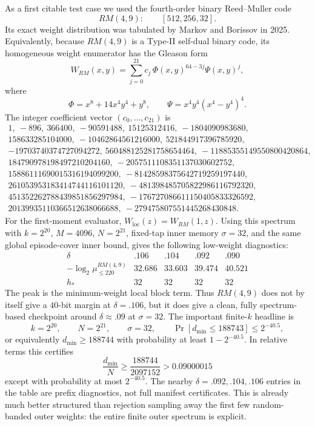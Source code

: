 As a first citable test case we used the fourth-order binary Reed--Muller code
\[
RM(4,9):\qquad [512,256,32].
\]
Its exact weight distribution was tabulated by Markov and Borissov in 2025.  Equivalently, because \(RM(4,9)\) is a
Type-II self-dual binary code, its homogeneous weight enumerator has the Gleason form
\[
W_{RM}(x,y)
=
\sum_{j=0}^{21} c_j\,
\Phi(x,y)^{64-3j}\Psi(x,y)^j,
\]
where
\[
\Phi=x^8+14x^4y^4+y^8,
\qquad
\Psi=x^4y^4(x^4-y^4)^4.
\]
The integer coefficient vector \((c_0,\ldots,c_{21})\) is
\[
\begin{gathered}
1,\ -896,\ 366400,\ -90591488,\ 15125312416,\ -1804090983680,\\
158633285104000,\ -10462864561216000,\ 521844917396785920,\\
-19703740374727094272,\ 560488125281758654464,\ -11885355149550800420864,\\
184790978198497210204160,\ -2057511108351137030602752,\\
15886111690015316194099200,\ -81428598375642719259197440,\\
261053953183414744116101120,\ -481398485705822986116792320,\\
451352262788439851856297984,\ -176727086611150405833326592,\\
20139935110366512638066688,\ -279475807551445268430848 .
\end{gathered}
\]
For the first-moment evaluator, \(W_{\mathrm{loc}}(z)=W_{RM}(1,z)\).  Using this spectrum with \(k=2^{20}\),
\(M=4096\), \(N=2^{21}\), fixed-tap inner memory \(\sigma=32\), and the same global episode-cover inner bound, gives
the following low-weight diagnostics:
\[
\begin{array}{c|rrrr}
\delta & .106 & .104 & .092 & .090\\
\hline
-\log_2 \mu_{\le220}^{RM(4,9)} & 32.686 & 33.603 & 39.474 & 40.521\\
h_* & 32 & 32 & 32 & 32
\end{array}
\]
The peak is the minimum-weight local block term.  Thus \(RM(4,9)\) does not by itself give a \(40\)-bit margin at
\(\delta=.106\), but it does give a clean, fully spectrum-based checkpoint around \(\delta\approx .09\) at
\(\sigma=32\).  The important finite-\(k\) headline is
\[
k=2^{20},\qquad N=2^{21},\qquad \sigma=32,\qquad
\Pr[d_{\min}\le188743]\le2^{-40.5},
\]
or equivalently \(d_{\min}\ge188744\) with probability at least \(1-2^{-40.5}\).  In relative terms this certifies
\[
\frac{d_{\min}}{N}\ge\frac{188744}{2097152}>0.09000015
\]
except with probability at most \(2^{-40.5}\).  The nearby \(\delta=.092,.104,.106\) entries in the table are prefix
diagnostics, not full manifest certificates.  This is already much better structured than rejection sampling away the
first few random-banded outer weights: the entire finite outer spectrum is explicit.

